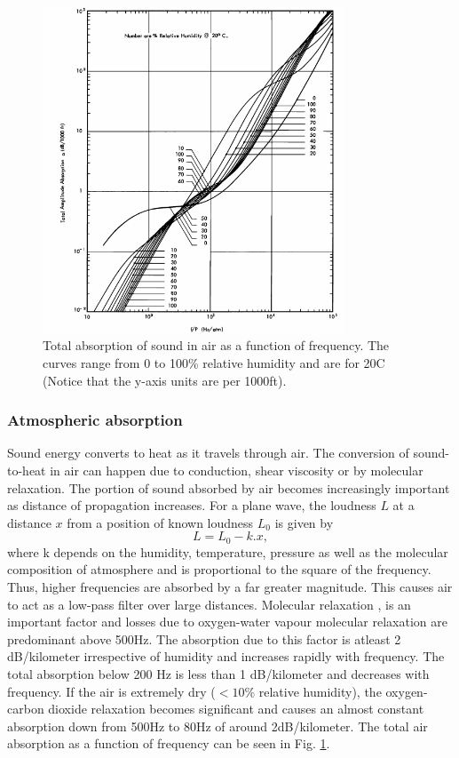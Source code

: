 \begin{figure}
\includegraphics[width=0.8\textwidth]{Figures/airAbsorption.png}
\caption{Total absorption of sound in air as a function of frequency. The curves range from 0 to 100\% relative humidity and are for 20\degree C \cite{evans1972atmospheric} (Notice that the y-axis units are per 1000ft).}
\label{Fig:airAbsorption}
\end{figure}
\subsubsection{Atmospheric absorption}
Sound energy converts to heat as it travels through air. The conversion of sound-to-heat in air can happen due to conduction, shear viscosity or by molecular relaxation. The portion of sound absorbed by air becomes increasingly important as distance of propagation increases. For a plane wave, the loudness $L$ at a distance $x$ from a position of known loudness $L_0$ is given by
\begin{equation}
    L= L_0 - k.x,
\end{equation}
where k depends on the humidity, temperature, pressure as well as the molecular composition of atmosphere and is proportional to the square of the frequency. Thus, higher frequencies are absorbed by a far greater magnitude. This causes air to act as a low-pass filter over large distances. Molecular relaxation \cite{bass1990atmospheric}, \cite{evans1972atmospheric} is an important factor and losses due to oxygen-water vapour molecular relaxation are predominant above 500Hz. The absorption due to this factor is atleast 2 dB/kilometer irrespective of humidity and increases rapidly with frequency. The total absorption below 200 Hz is less than 1 dB/kilometer and decreases with frequency. If the air is extremely dry ($< 10\%$ relative humidity), the oxygen-carbon dioxide relaxation becomes significant and causes an almost constant absorption down from 500Hz to 80Hz of around 2dB/kilometer. The total air absorption as a function of frequency can be seen in Fig. \ref{Fig:airAbsorption}.
